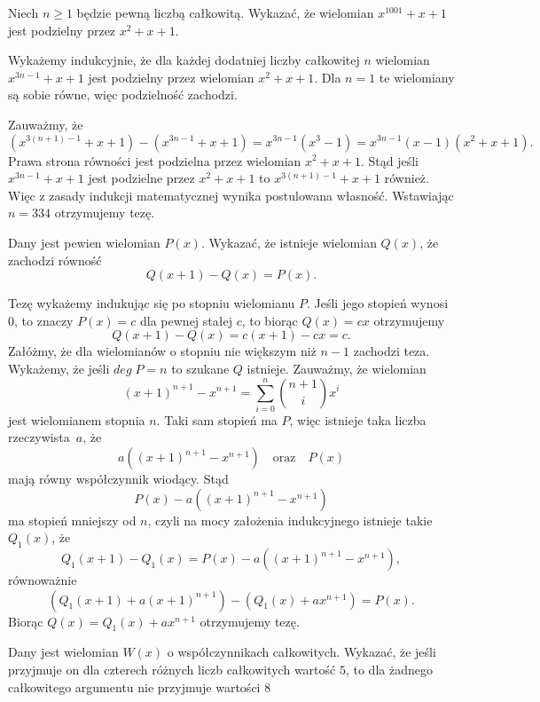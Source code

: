\begin{problem}{3}
    Niech $n \geqslant 1$ będzie pewną liczbą całkowitą. Wykazać, że wielomian $x^{1001} + x + 1$ jest podzielny przez $x^2 + x + 1$.
\end{problem}

\noindent
Wykażemy indukcyjnie, że dla każdej dodatniej liczby całkowitej $n$ wielomian $x^{3n - 1} + x + 1$ jest podzielny przez wielomian $x^2 + x + 1$. Dla $n = 1$ te wielomiany są sobie równe, więc podzielność zachodzi.

Zauważmy, że
\[
    (x^{3(n + 1) - 1} + x + 1) - (x^{3n - 1} + x + 1) = x^{3n - 1}(x^3 - 1) =   x^{3n - 1}(x - 1)(x^2 + x + 1).
\]
Prawa strona równości jest podzielna przez wielomian $x^2 + x + 1$. Stąd jeśli $x^{3n - 1} + x + 1$ jest podzielne przez $x^2 + x + 1$ to $x^{3(n + 1) - 1} + x + 1$ również. Więc z zasady indukcji matematycznej wynika postulowana własność. Wstawiając $n = 334$ otrzymujemy tezę.


\begin{problem}{4}
    Dany jest pewien wielomian $P(x)$. Wykazać, że istnieje wielomian $Q(x)$, że zachodzi równość
    \[
        Q(x + 1) - Q(x) = P(x).
    \]
\end{problem}

\noindent
Tezę wykażemy indukując się po stopniu wielomianu $P$. Jeśli jego stopień wynosi $0$, to znaczy $P(x) = c$ dla pewnej stałej $c$, to biorąc $Q(x) = cx$ otrzymujemy
\[
    Q(x + 1) - Q(x) = c(x + 1) - cx = c.
\]
Załóżmy, że dla wielomianów o stopniu nie większym niż $n - 1$ zachodzi teza. Wykażemy, że jeśli ${deg\; P = n}$ to szukane $Q$ istnieje.
Zauważmy, że wielomian 
\[
    (x + 1)^{n + 1} - x^{n + 1} = \sum^{n}_{i = 0} {{n + 1}\choose{i}}x^i
\]
jest wielomianem stopnia $n$. Taki sam stopień ma $P$, więc istnieje taka liczba rzeczywista~$a$, że
\[
    a\left((x + 1)^{n + 1} - x^{n + 1} \right) \quad \text{oraz} \quad P(x)
\]
mają równy współczynnik wiodący. Stąd
\[
    P(x) - a\left((x + 1)^{n + 1} - x^{n + 1} \right)
\]
ma stopień mniejszy od $n$, czyli na mocy założenia indukcyjnego istnieje takie $Q_1(x)$, że
\[
    Q_1(x + 1) - Q_1(x) = P(x) - a\left((x + 1)^{n + 1} - x^{n + 1} \right),
\]
równoważnie
\[
    (Q_1(x + 1) + a(x + 1)^{n + 1}) - (Q_1(x) + ax^{n + 1}) = P(x).
\]
Biorąc $Q(x) = Q_1(x) + ax^{n + 1}$ otrzymujemy tezę.

\begin{problem}{5}
    Dany jest wielomian $W(x)$ o współczynnikach całkowitych. Wykazać, że jeśli przyjmuje on dla czterech różnych liczb całkowitych wartość $5$, to dla żadnego całkowitego argumentu nie przyjmuje wartości $8$
\end{problem}

